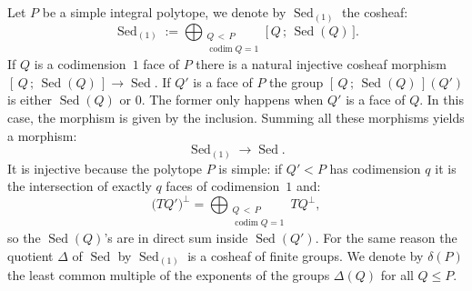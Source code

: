 \documentclass[AHL,Unicode,longabstracts,published]{cedram}
\DeclareMathOperator{\Sed}{Sed}
\DeclareMathOperator{\codim}{codim}
\begin{document}
\begin{defi}
Let $P$ be a simple integral polytope, we denote by $\Sed_{(1)}$ the cosheaf:
\begin{equation*}
\Sed_{(1)}:= \bigoplus_{\substack{Q\,<\,P \\ \codim Q =1}} \Big[\, Q\, ;\, \Sed(Q) \, \Big].
\end{equation*}
If $Q$ is a codimension~$1$ face of $P$ there is a natural injective cosheaf morphism $[\, Q\, ;\, \Sed(Q) \, ]\rightarrow \Sed$. If $Q'$ is a face of $P$ the group $[\, Q\, ;\, \Sed(Q) \,](Q')$ is either $\Sed(Q)$ or $0$. The former only happens when $Q'$ is a face of $Q$. In this case, the morphism is given by the inclusion. Summing all these morphisms yields a morphism:
\begin{equation*}
\Sed_{(1)}\rightarrow \Sed.
\end{equation*}
It is injective because the polytope $P$ is simple: if $Q'<P$ has codimension $q$ it is the intersection of exactly $q$ faces of codimension~$1$ and:
\begin{equation*}
\Big(TQ'\Big)^\perp=\bigoplus_{\substack{Q\,<\,P \\ \codim Q =1}} TQ^\perp,
\end{equation*}
so the $\Sed(Q)$'s are in direct sum inside $\Sed(Q')$. For the same reason the quotient $\Delta$ of $\Sed$ by $\Sed_{(1)}$ is a cosheaf of finite groups. We denote by $\delta(P)$ the least common multiple of the exponents of the groups $\Delta(Q)$ for all $Q\leq P$.
\end{defi}
\end{document}
